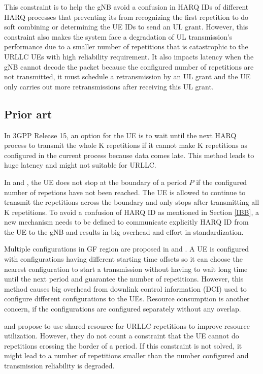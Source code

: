 \documentclass[conference]{IEEEtran}
\begin{document}
This constraint is to help the gNB avoid a confusion in HARQ IDs of different HARQ processes that preventing its from recognizing the first repetition to do soft combining or determining the UE IDs to send an UL grant. However, this constraint also makes the system face a degradation of UL transmission's performance due to a smaller number of repetitions that is catastrophic to the URLLC UEs with high reliability requirement. It also impacts latency when the gNB cannot decode the packet because the configured number of repetitions are not transmitted, it must schedule a retransmission by an UL grant and the UE only carries out more retransmissions after receiving this UL grant.

\subsection{Prior art}\label{ICC}
In 3GPP Release 15, an option for the UE is to wait until the next HARQ process to transmit the whole K repetitions if it cannot make K repetitions as configured in the current process because data comes late. This method leads to huge latency and might not suitable for URLLC.

In \cite{b1} and \cite{b2}, the UE does not stop at the boundary of a period $P$ if the configured number of repetions have not been reached. The UE is allowed to continue to transmit the repetitions across the boundary and only stops after transmitting all K repetitions. To avoid a confusion of HARQ ID as mentioned in Section \ref{IBB}, a new mechanism needs to be defined to communicate explicitly HARQ ID from the UE to the gNB and results in big overhead and effort in standardization.  

Multiple configurations in GF region are proposed in \cite{b3} and \cite{b4}. A UE is configured with configurations having different starting time offsets so it can choose the nearest configuration to start a transmission without having to wait long time until the next period and guarantee the number of repetitions. However, this method causes big overhead from downlink control information (DCI) used to configure different configurations to the UEs. Resource consumption is another concern, if the configurations are configured separately without any overlap. 

\cite{b5} and \cite{b7} propose to use shared resource for URLLC repetitions to improve resource utilization. However, they do not count a constraint that the UE cannot do repetitions crossing the border of a period. If this constraint is not solved, it might lead to a number of repetitions smaller than the  number configured and transmission reliability is degraded.
\end{document}
